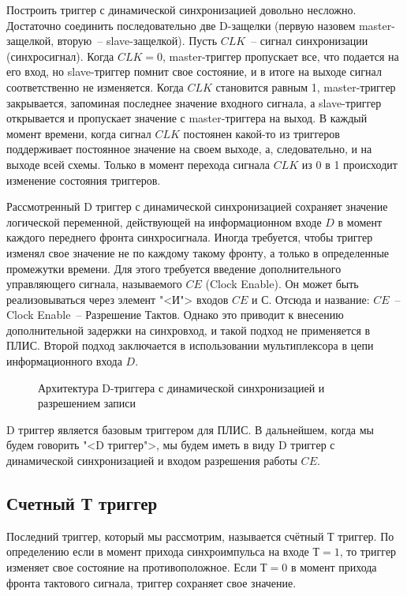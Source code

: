 Построить триггер с динамической синхронизацией довольно несложно. Достаточно соединить последовательно две D-защелки (первую назовем master-защелкой, вторую~-- slave-защелкой). Пусть $CLK$~-- сигнал синхронизации (синхросигнал). Когда $CLK=0$, master-триггер пропускает все, что подается на его вход, но slave-триггер помнит свое состояние, и в итоге на выходе сигнал соответственно не изменяется. Когда $CLK$ становится равным 1, master-триггер закрывается, запоминая последнее значение входного сигнала, а slave-триггер открывается и пропускает значение с master-триггера на выход. В каждый момент времени, когда сигнал $CLK$ постоянен какой-то из триггеров поддерживает постоянное значение на своем выходе, а, следовательно, и на выходе всей схемы. Только в момент перехода сигнала $CLK$ из 0 в 1 происходит изменение состояния триггеров.

Рассмотренный D триггер с динамической синхронизацией сохраняет значение логической переменной, действующей на информационном входе $D$ в момент каждого переднего фронта синхросигнала. Иногда требуется, чтобы триггер изменял свое значение не по каждому такому фронту, а только в определенные промежутки времени. Для этого требуется введение дополнительного управляющего сигнала, называемого $CE$ (Clock Enable). Он может быть реализовываться через элемент "<И"> входов $CE$ и $С$. Отсюда и название: $CE$~-- Clock Enable~-- Разрешение Тактов. Однако это приводит к внесению дополнительной задержки на синхровход, и такой подход не применяется в ПЛИС. Второй подход заключается в использовании мультиплексора в цепи информационного входа $D$.

\begin{figure}[ht]
\centering
{}
\caption{Архитектура D-триггера с динамической синхронизацией и разрешением записи}
\label{D_trigger_CE_arch}
\end{figure}

D триггер является базовым триггером для ПЛИС. В дальнейшем, когда мы будем говорить "<D триггер">, мы будем иметь в виду D триггер с динамической синхронизацией и входом разрешения работы $CE$. 

\subsection{Счетный Т триггер}

Последний триггер, который мы рассмотрим, называется счётный Т триггер. По определению если в момент прихода синхроимпульса на входе $Т=1$, то триггер изменяет свое состояние на противоположное. Если $Т=0$ в момент прихода фронта тактового сигнала, триггер сохраняет свое значение.

